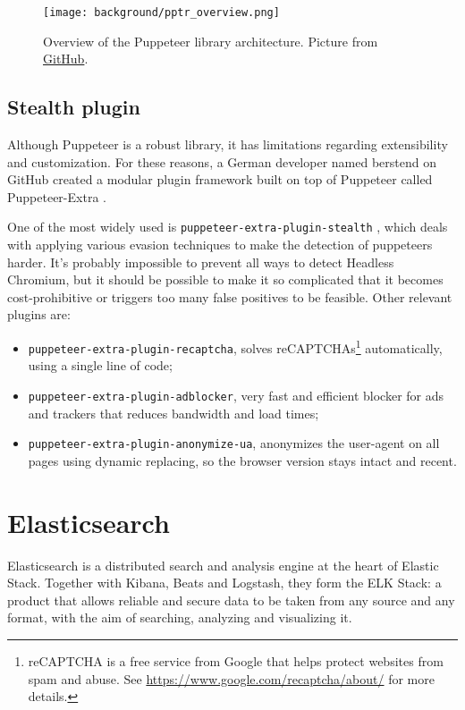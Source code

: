\documentclass[../thesis.tex]{subfiles}
\begin{document}
\begin{figure}[H]
    \centering
    \texttt{[image: background/pptr\_overview.png]}
    \caption[Puppeteer architecture overview]{Overview of the Puppeteer library architecture. Picture from \href{https://raw.githubusercontent.com/puppeteer/puppeteer/main/docs/assets/overview.png}{GitHub}.}
    \label{fig:puppeteer_overview}
\end{figure}

\subsection{Stealth plugin}
Although Puppeteer is a robust library, it has limitations regarding extensibility and customization. For these reasons, a German developer named berstend on GitHub created a modular plugin framework built on top of Puppeteer called Puppeteer-Extra \cite{site:puppeteer_extra_wiki}.

One of the most widely used is \texttt{puppeteer-extra-plugin-stealth} \cite{site:puppeteer_extra_stealth}, which deals with applying various evasion techniques to make the detection of puppeteers harder. It's probably impossible to prevent all ways to detect Headless Chromium, but it should be possible to make it so complicated that it becomes cost-prohibitive or triggers too many false positives to be feasible. Other relevant plugins are:

\begin{itemize}
    \item \texttt{puppeteer-extra-plugin-recaptcha}, solves reCAPTCHAs\footnote{reCAPTCHA is a free service from Google that helps protect websites from spam and abuse. See \href{https://www.google.com/recaptcha/about/}{https://www.google.com/recaptcha/about/} for more details.} automatically, using a single line of code;
    \item \texttt{puppeteer-extra-plugin-adblocker}, very fast and efficient blocker for ads and trackers that reduces bandwidth and load times;
    \item \texttt{puppeteer-extra-plugin-anonymize-ua}, anonymizes the user-agent on all pages using dynamic replacing, so the browser version stays intact and recent.
\end{itemize}

\section{Elasticsearch}\label{sec:elasticsearch}
Elasticsearch is a distributed search and analysis engine at the heart of Elastic Stack. Together with Kibana, Beats and Logstash, they form the ELK Stack: a product that allows reliable and secure data to be taken from any source and any format, with the aim of searching, analyzing and visualizing it.
\end{document}
